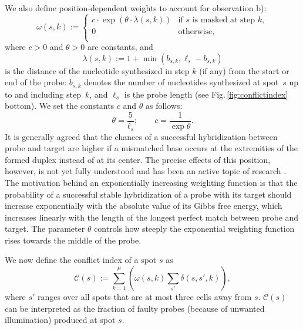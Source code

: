 \documentclass[runningheads]{llncs}
\begin{document}
We also define position-dependent weights to account for observation b):
\begin{equation}\label{eq:pos_mult}
\omega(s,k) :=
\left\{
  \begin{array}{ll}
    c \cdot \exp{\left(\theta \cdot \lambda(s,k)\right)} & \mbox{if $s$ is masked at step $k$}, \\
    0 & \mbox{otherwise}, \\
  \end{array}
\right.
\end{equation}
where $c>0$ and $\theta>0$ are constants, and
\begin{equation}\label{eq:base_pos}
  \lambda(s,k) := 1 + \min(b_{s,k},\ell_{s} - b_{s,k})
\end{equation}
is the distance of the nucleotide synthesized in step $k$ (if any)
from the start or end of the probe: $b_{s,k}$ denotes the number of
nucleotides synthesized at spot~$s$ up to and including step~$k$, and
$\ell_s$ is the probe length (see Fig.\,\ref{fig:conflictindex}
bottom). We set the constants $c$ and $\theta$ as follows:
\[ \theta = \frac{5}{\ell_s}; \qquad c = \frac{1}{\exp{\theta}}. \]
It is generally agreed that the chances of a successful hybridization
between probe and target are higher if a mismatched base occurs at the
extremities of the formed duplex instead of at its center. The precise
effects of this position, however, is not yet fully understood and has
been an active topic of research \cite{BINDER05}. The motivation
behind an exponentially increasing weighting function is that the
probability of a successful stable hybridization of a probe with its
target should increase exponentially with the absolute value of its
Gibbs free energy, which increases linearly with the length of the
longest perfect match between probe and target. The parameter $\theta$
controls how steeply the exponential weighting function rises towards
the middle of the probe.

We now define the conflict index of a spot $s$ as
\begin{equation}
\label{eq:conf_idx}
\mathcal{C}(s) := \sum_{k=1}^{\mu} \left( \omega(s,k) \sum_{s'} \delta(s,s',k) \right),
\end{equation}
where $s'$ ranges over all spots that are at most three cells away
from $s$.  $\mathcal{C}(s)$ can be interpreted as the fraction of
faulty probes (because of unwanted illumination) produced at spot $s$.
\end{document}
